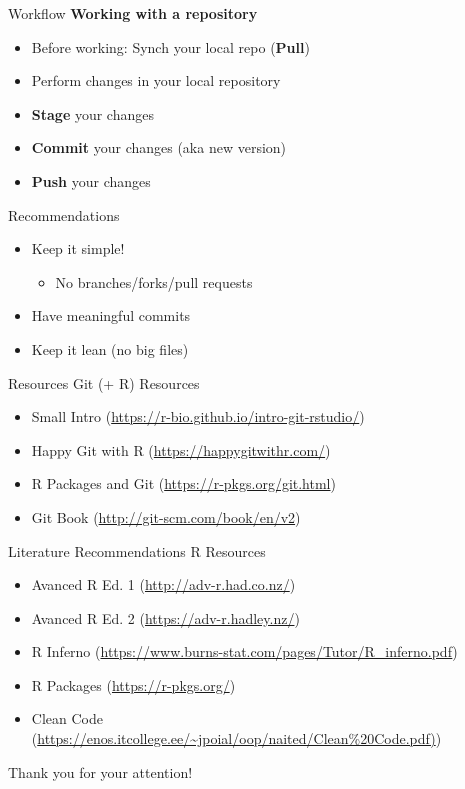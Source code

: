 \documentclass{beamer}\usepackage[]{graphicx}\usepackage[]{color}
\begin{document}
\begin{frame}{Workflow}
\textbf{Working with a repository}
\begin{itemize}
  \item Before working: Synch your local repo (\textbf{Pull})
  \item Perform changes in your local repository
  \item \textbf{Stage} your changes
  \item \textbf{Commit} your changes (aka new version)
  \item \textbf{Push} your changes
\end{itemize}
\end{frame}

\begin{frame}{Recommendations}
\begin{itemize}
  \item Keep it simple! 
  \begin{itemize}
    \item No branches/forks/pull requests
  \end{itemize}
  \item Have meaningful commits
  \item Keep it lean (no big files)
\end{itemize}
\end{frame}

\begin{frame}{Resources}
Git (+ R) Resources
\begin{itemize}
\item Small Intro (\url{https://r-bio.github.io/intro-git-rstudio/})
\item Happy Git with R (\url{https://happygitwithr.com/})
\item R Packages and Git (\url{https://r-pkgs.org/git.html})
\item Git Book (\url{http://git-scm.com/book/en/v2})
\end{itemize}

\end{frame}

\begin{frame}{Literature Recommendations}
R Resources
\begin{itemize}
\item Avanced R Ed. 1 (\url{http://adv-r.had.co.nz/})
\item Avanced R Ed. 2 (\url{https://adv-r.hadley.nz/})
\item R Inferno (\url{https://www.burns-stat.com/pages/Tutor/R_inferno.pdf})
\item R Packages (\url{https://r-pkgs.org/})
\item Clean Code (\url{https://enos.itcollege.ee/~jpoial/oop/naited/Clean\%20Code.pdf)})
\end{itemize}

\end{frame}


\begin{frame}[plain]

\begin{center}
\Large Thank you for your attention!

\end{center}

\end{frame}
\end{document}
